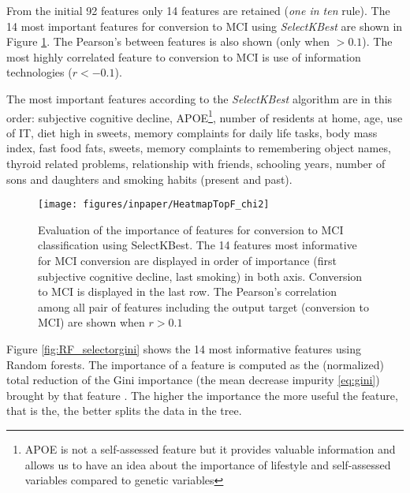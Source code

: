\documentclass[preprint,12pt]{elsarticle}
\begin{document}
From the initial 92 features only 14 features are retained (\emph{one in ten} rule). The 14 most important features for conversion to MCI using \emph{SelectKBest} are shown in Figure \ref{fig:rf14}. The Pearson's between features is also shown (only when $>0.1$). The most highly correlated feature to conversion to MCI is use of information technologies ($r<-0.1$). 

The most important features according to the \emph{SelectKBest} algorithm are in this order: subjective cognitive decline, APOE\footnote{APOE is not a self-assessed feature but it provides valuable information and allows us to have an idea about the importance of lifestyle and self-assessed variables compared to genetic variables}, number of residents at home, age, use of IT, diet high in sweets, memory complaints for daily life tasks, body mass index, fast food fats, sweets, memory complaints to remembering object names, thyroid related problems, relationship with friends, schooling years, number of sons and daughters and smoking habits (present and past).  

\begin{figure}[!htb]
        \centering
        \texttt{[image: figures/inpaper/HeatmapTopF\_chi2]}
        \caption{Evaluation of the importance of features for conversion to MCI classification using SelectKBest. The 14 features most informative for MCI conversion are displayed in order of importance (first subjective cognitive decline, last smoking) in both axis. Conversion to MCI is displayed in the last row. The Pearson's correlation among all pair of features including the output target (conversion to MCI) are shown when $r>0.1$ } 
        \label{fig:rf14}
\end{figure}


Figure \ref{fig:RF_selectorgini} shows the 14 most informative features using Random forests. The importance of a feature is computed as the (normalized) total reduction of the Gini importance (the mean decrease impurity \ref{eq:gini}) brought by that feature \cite{breiman2017classification}. The higher the importance 
the more useful the feature, that is the, the better splits the data in the tree. 
\end{document}
